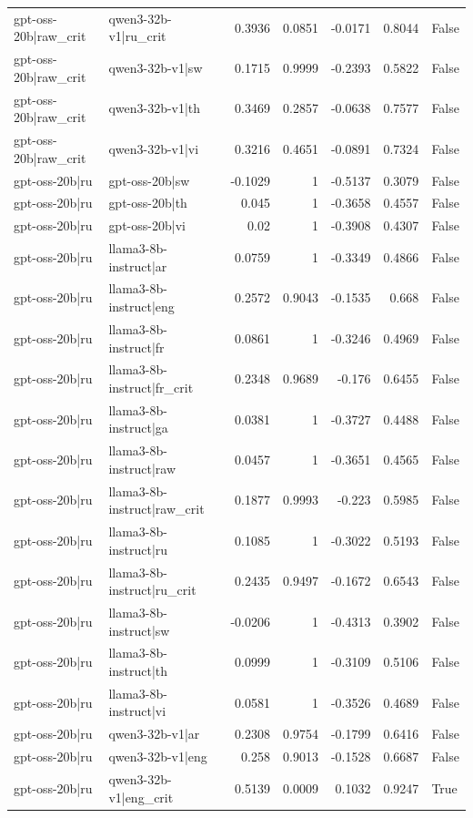 \begin{table}
\begin{tabular}{l l r r r r l}
gpt-oss-20b|raw_crit & qwen3-32b-v1|ru_crit & 0.3936 & 0.0851 & -0.0171 & 0.8044 & False \\
gpt-oss-20b|raw_crit & qwen3-32b-v1|sw & 0.1715 & 0.9999 & -0.2393 & 0.5822 & False \\
gpt-oss-20b|raw_crit & qwen3-32b-v1|th & 0.3469 & 0.2857 & -0.0638 & 0.7577 & False \\
gpt-oss-20b|raw_crit & qwen3-32b-v1|vi & 0.3216 & 0.4651 & -0.0891 & 0.7324 & False \\
gpt-oss-20b|ru & gpt-oss-20b|sw & -0.1029 & 1 & -0.5137 & 0.3079 & False \\
gpt-oss-20b|ru & gpt-oss-20b|th & 0.045 & 1 & -0.3658 & 0.4557 & False \\
gpt-oss-20b|ru & gpt-oss-20b|vi & 0.02 & 1 & -0.3908 & 0.4307 & False \\
gpt-oss-20b|ru & llama3-8b-instruct|ar & 0.0759 & 1 & -0.3349 & 0.4866 & False \\
gpt-oss-20b|ru & llama3-8b-instruct|eng & 0.2572 & 0.9043 & -0.1535 & 0.668 & False \\
gpt-oss-20b|ru & llama3-8b-instruct|fr & 0.0861 & 1 & -0.3246 & 0.4969 & False \\
gpt-oss-20b|ru & llama3-8b-instruct|fr_crit & 0.2348 & 0.9689 & -0.176 & 0.6455 & False \\
gpt-oss-20b|ru & llama3-8b-instruct|ga & 0.0381 & 1 & -0.3727 & 0.4488 & False \\
gpt-oss-20b|ru & llama3-8b-instruct|raw & 0.0457 & 1 & -0.3651 & 0.4565 & False \\
gpt-oss-20b|ru & llama3-8b-instruct|raw_crit & 0.1877 & 0.9993 & -0.223 & 0.5985 & False \\
gpt-oss-20b|ru & llama3-8b-instruct|ru & 0.1085 & 1 & -0.3022 & 0.5193 & False \\
gpt-oss-20b|ru & llama3-8b-instruct|ru_crit & 0.2435 & 0.9497 & -0.1672 & 0.6543 & False \\
gpt-oss-20b|ru & llama3-8b-instruct|sw & -0.0206 & 1 & -0.4313 & 0.3902 & False \\
gpt-oss-20b|ru & llama3-8b-instruct|th & 0.0999 & 1 & -0.3109 & 0.5106 & False \\
gpt-oss-20b|ru & llama3-8b-instruct|vi & 0.0581 & 1 & -0.3526 & 0.4689 & False \\
gpt-oss-20b|ru & qwen3-32b-v1|ar & 0.2308 & 0.9754 & -0.1799 & 0.6416 & False \\
gpt-oss-20b|ru & qwen3-32b-v1|eng & 0.258 & 0.9013 & -0.1528 & 0.6687 & False \\
gpt-oss-20b|ru & qwen3-32b-v1|eng_crit & 0.5139 & 0.0009 & 0.1032 & 0.9247 & True \\

\end{tabular}
\end{table}
